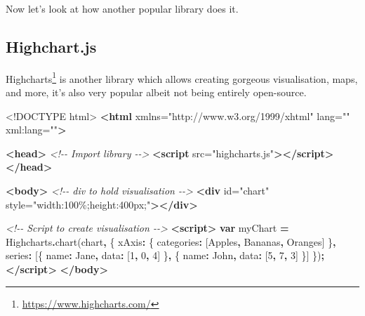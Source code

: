 \documentclass[
]{krantz}
\makeatletter
\newenvironment{Shaded}{\begin{snugshade}}{\end{snugshade}}
\newcommand{\CommentTok}[1]{\textcolor[rgb]{0.37,0.37,0.37}{\textit{#1}}}
\newcommand{\DataTypeTok}[1]{\textcolor[rgb]{0.27,0.27,0.27}{#1}}
\newcommand{\DecValTok}[1]{\textcolor[rgb]{0.06,0.06,0.06}{#1}}
\newcommand{\FunctionTok}[1]{\textcolor[rgb]{0,0,0}{#1}}
\newcommand{\KeywordTok}[1]{\textcolor[rgb]{0.27,0.27,0.27}{\textbf{#1}}}
\newcommand{\NormalTok}[1]{#1}
\newcommand{\OperatorTok}[1]{\textcolor[rgb]{0.43,0.43,0.43}{\textbf{#1}}}
\newcommand{\OtherTok}[1]{\textcolor[rgb]{0.37,0.37,0.37}{#1}}
\newcommand{\StringTok}[1]{\textcolor[rgb]{0.5,0.5,0.5}{#1}}
\renewcommand{\href}[2]{#2\footnote{\url{#1}}}
\newenvironment{kframe}{%
\medskip{}
\setlength{\fboxsep}{.8em}
 \def\at@end@of@kframe{}%
 \ifinner\ifhmode%
  \def\at@end@of@kframe{\end{minipage}}%
  \begin{minipage}{\columnwidth}%
 \fi\fi%
 \def\FrameCommand##1{\hskip\@totalleftmargin \hskip-\fboxsep
 \colorbox{shadecolor}{##1}\hskip-\fboxsep
     \hskip-\linewidth \hskip-\@totalleftmargin \hskip\columnwidth}%
 \MakeFramed {\advance\hsize-\width
   \@totalleftmargin\z@ \linewidth\hsize
   \@setminipage}}%
 {\par\unskip\endMakeFramed%
 \at@end@of@kframe}
\renewenvironment{Shaded}{\begin{kframe}}{\end{kframe}}
\makeatother
\begin{document}
Now let's look at how another popular library does it.

\hypertarget{highchart.js}{%
\subsection*{Highchart.js}\label{highchart.js}}


\href{https://www.highcharts.com/}{Highcharts} is another library which allows creating gorgeous visualisation, maps, and more, it's also very popular albeit not being entirely open-source.

\begin{Shaded}
\begin{Highlighting}[]
\DataTypeTok{\textless{}!DOCTYPE }\NormalTok{html}\DataTypeTok{\textgreater{}}
\KeywordTok{\textless{}html}\OtherTok{ xmlns=}\StringTok{"http://www.w3.org/1999/xhtml"}\OtherTok{ lang=}\StringTok{""}\OtherTok{ xml:lang=}\StringTok{""}\KeywordTok{\textgreater{}}

\KeywordTok{\textless{}head\textgreater{}}
  \CommentTok{\textless{}!{-}{-} Import library {-}{-}\textgreater{}}
  \KeywordTok{\textless{}script}\OtherTok{ src=}\StringTok{"highcharts.js"}\KeywordTok{\textgreater{}\textless{}/script\textgreater{}}
\KeywordTok{\textless{}/head\textgreater{}}

\KeywordTok{\textless{}body\textgreater{}}
  \CommentTok{\textless{}!{-}{-} div to hold visualisation {-}{-}\textgreater{}}
  \KeywordTok{\textless{}div}\OtherTok{ id=}\StringTok{"chart"}\OtherTok{ style=}\StringTok{"width:100\%;height:400px;"}\KeywordTok{\textgreater{}\textless{}/div\textgreater{}}

  \CommentTok{\textless{}!{-}{-} Script to create visualisation {-}{-}\textgreater{}}
  \KeywordTok{\textless{}script\textgreater{}}
    \KeywordTok{var}\NormalTok{ myChart }\OperatorTok{=}\NormalTok{ Highcharts}\OperatorTok{.}\FunctionTok{chart}\NormalTok{(}\StringTok{\textquotesingle{}chart\textquotesingle{}}\OperatorTok{,}\NormalTok{ \{}
        \DataTypeTok{xAxis}\OperatorTok{:}\NormalTok{ \{}
            \DataTypeTok{categories}\OperatorTok{:}\NormalTok{ [}\StringTok{\textquotesingle{}Apples\textquotesingle{}}\OperatorTok{,} \StringTok{\textquotesingle{}Bananas\textquotesingle{}}\OperatorTok{,} \StringTok{\textquotesingle{}Oranges\textquotesingle{}}\NormalTok{]}
\NormalTok{        \}}\OperatorTok{,}
        \DataTypeTok{series}\OperatorTok{:}\NormalTok{ [\{}
            \DataTypeTok{name}\OperatorTok{:} \StringTok{\textquotesingle{}Jane\textquotesingle{}}\OperatorTok{,}
            \DataTypeTok{data}\OperatorTok{:}\NormalTok{ [}\DecValTok{1}\OperatorTok{,} \DecValTok{0}\OperatorTok{,} \DecValTok{4}\NormalTok{]}
\NormalTok{        \}}\OperatorTok{,}\NormalTok{ \{}
            \DataTypeTok{name}\OperatorTok{:} \StringTok{\textquotesingle{}John\textquotesingle{}}\OperatorTok{,}
            \DataTypeTok{data}\OperatorTok{:}\NormalTok{ [}\DecValTok{5}\OperatorTok{,} \DecValTok{7}\OperatorTok{,} \DecValTok{3}\NormalTok{]}
\NormalTok{        \}]}
\NormalTok{    \})}\OperatorTok{;}
  \KeywordTok{\textless{}/script\textgreater{}}
\KeywordTok{\textless{}/body\textgreater{}}


\end{Highlighting}
\end{Shaded}
\end{document}

